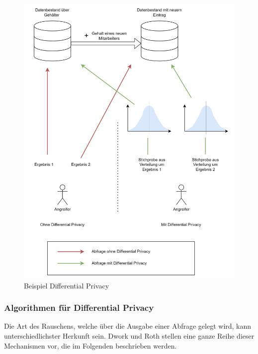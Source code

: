 \begin{figure}[!htb]
    \centering
    \includegraphics[width=15cm]{figures/dp}
    \caption{Beispiel Differential Privacy}
    \label{fig:dp}
\end{figure} 

\subsubsection*{Algorithmen für Differential Privacy}
Die Art des Rauschens, welche über die Ausgabe einer Abfrage gelegt wird, kann unterschiedlichster Herkunft sein.
Dwork und Roth \cite{P-27} stellen eine ganze Reihe dieser Mechanismen vor, die im Folgenden beschrieben werden.

